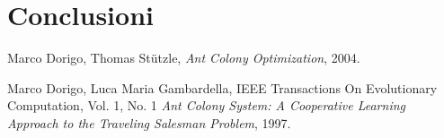 \documentclass{article}
\begin{document}
\section{Conclusioni}

\pagebreak
\begin{thebibliography}{9}
    Marco Dorigo, Thomas Stützle,
    \textit{Ant Colony Optimization}, 2004.

    Marco Dorigo, Luca Maria Gambardella,
    IEEE Transactions On Evolutionary Computation, Vol. 1, No. 1
    \textit{Ant Colony System: A Cooperative Learning Approach to the Traveling Salesman Problem},
    1997.
\end{thebibliography}
\end{document}

